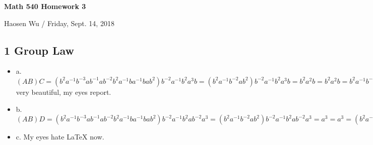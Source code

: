 \documentclass[11pt]{article}
\theoremstyle{remark}
\begin{document}
\begin{center}
    \begin{Large} {\bf Math 540 Homework 3}\\
    \end{Large}
    Haosen Wu  / Friday, Sept. 14, 2018
\end{center}
\subsection*{1 Group Law}
\begin{itemize}
    \item a. $(AB)C=
    (b^2a^{-1}b^{-3}ab^{-1}ab^{-2}b^2a^{-1}ba^{-1}bab^2)b^{-2}a^{-1}b^2a^3b=
    (b^2a^{-1}b^{-2}ab^2)b^{-2}a^{-1}b^2a^3b=
    b^2a^2b=
    b^2a^2b=
    b^2a^{-1}b^{-3}ab^{-1}ab^{-2}(b^2a^{-1}ba^{-1}b^3a^3b)=
    b^2a^{-1}b^{-3}ab^{-1}ab^{-2}(b^2a^{-1}ba^{-1}bab^2b^{-2}a^{-1}b^2a^3b)=
    A(BC)$ very beautiful, my eyes report.
    \item b. $(AB)D=
    (b^2a^{-1}b^{-3}ab^{-1}ab^{-2}b^2a^{-1}ba^{-1}bab^2)b^{-2}a^{-1}b^2ab^{-2}a^3=
    (b^2a^{-1}b^{-2}ab^2)b^{-2}a^{-1}b^2ab^{-2}a^3=
    a^3=
    a^3=
    (b^2a^{-1}b^{-3}ab^{-1}ab^{-2}b^2a^{-1}ba^{-1}b^3ab^{-2})a^3=
    b^2a^{-1}b^{-3}ab^{-1}ab^{-2}(b^2a^{-1}ba^{-1}b^3ab^{-2}a^3)=
    b^2a^{-1}b^{-3}ab^{-1}ab^{-2}(b^2a^{-1}ba^{-1}bab^2b^{-2}a^{-1}b^2ab^{-2}a^3)=
    A(BD)$ 
    \item c. My eyes hate LaTeX now.
\end{itemize}
\end{document}
